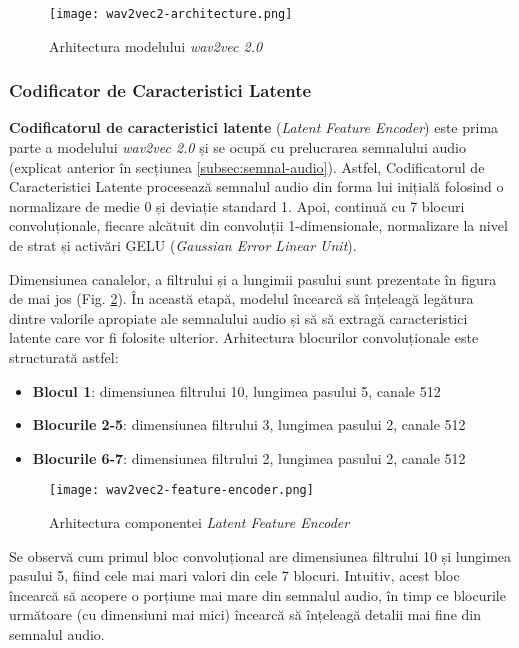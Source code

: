 \begin{figure}[h]
    \centering
    \texttt{[image: wav2vec2-architecture.png]}
    \caption{Arhitectura modelului \textit{wav2vec 2.0} \protect\footnotemark[2]}
    \label{fig:wav2vec2-architecture}
\end{figure}

\subsubsection{Codificator de Caracteristici Latente}
\textbf{Codificatorul de caracteristici latente} (\textit{Latent Feature Encoder}) este prima parte a modelului
\textit{wav2vec 2.0} și se ocupă cu prelucrarea semnalului audio (explicat anterior în secțiunea \ref{subsec:semnal-audio}).
Astfel, Codificatorul de Caracteristici Latente procesează semnalul audio din forma lui inițială folosind o 
normalizare de medie 0 și deviație standard 1. Apoi, continuă cu 7 blocuri convoluționale, fiecare alcătuit
din convoluții 1-dimensionale, normalizare la nivel de strat și activări GELU (\textit{Gaussian Error Linear Unit}).
\par
Dimensiunea canalelor, a filtrului și a lungimii pasului sunt prezentate în figura de mai jos
(Fig. \ref{fig:latent-feature-encoder}). În această etapă, modelul încearcă să înțeleagă legătura dintre
valorile apropiate ale semnalului audio și să să extragă caracteristici latente care vor fi folosite ulterior. Arhitectura
blocurilor convoluționale este structurată astfel:
\begin{itemize}
    \item \textbf{Blocul 1}: dimensiunea filtrului 10, lungimea pasului 5, canale 512
    \item \textbf{Blocurile 2-5}: dimensiunea filtrului 3, lungimea pasului 2, canale 512
    \item \textbf{Blocurile 6-7}: dimensiunea filtrului 2, lungimea pasului 2, canale 512
\end{itemize}


\vspace{-0.5em}
\begin{figure}[h]
    \centering
    \texttt{[image: wav2vec2-feature-encoder.png]}
    \caption{Arhitectura componentei \textit{Latent Feature Encoder} \protect\footnotemark[1]}
    \label{fig:latent-feature-encoder}
\end{figure}
\vspace{-0.5em}
\par
Se observă cum primul bloc convoluțional are dimensiunea filtrului 10 și lungimea pasului 5,
fiind cele mai mari valori din cele 7 blocuri. Intuitiv, acest bloc încearcă să acopere o porțiune
mai mare din semnalul audio, în timp ce blocurile următoare (cu dimensiuni mai mici) încearcă să
înțeleagă detalii mai fine din semnalul audio.

